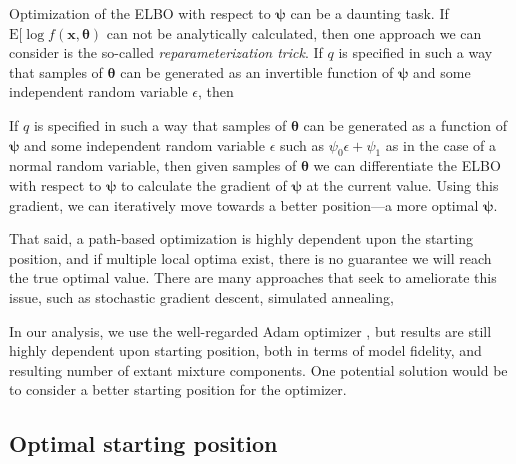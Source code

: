Optimization of the ELBO with respect to $\bm{\psi}$ can be a daunting task. If
    $\text{E}[\log f(\bm{x},\bm{\theta})$ can not be analytically calculated, then
    one approach we can consider is the so-called \emph{reparameterization trick}.
    If $q$ is specified in such a way that samples of $\bm{\theta}$ can be generated
    as an invertible function of $\bm{\psi}$ and some independent random variable 
    $\epsilon$, then





    If $q$ is specified in such a way that samples of $\bm{\theta}$ can be 
    generated as a function of $\bm{\psi}$ and some independent random variable 
    $\epsilon$ such as $\psi_0\epsilon + \psi_1$ as in the case of a normal
    random variable, then given samples of $\bm{\theta}$ we can differentiate 
    the ELBO with respect to $\bm{\psi}$ to calculate the gradient of $\bm{\psi}$
    at the current value.  Using this gradient, we can iteratively move towards
    a better position---a more optimal $\bm{\psi}$.

That said, a path-based optimization is highly dependent upon the starting position,
    and if multiple local optima exist, there is no guarantee we will reach the
    true optimal value.  There are many approaches that seek to ameliorate this issue,
    such as stochastic gradient descent, simulated annealing,
    
    
    In our analysis, we use the well-regarded Adam optimizer \citep{kingma2017}, 
    but results are still highly dependent upon starting position, both in terms of 
    model fidelity, and resulting number of extant mixture components.  One potential
    solution would be to consider a better starting position for the optimizer.

\subsection{Optimal starting position}

